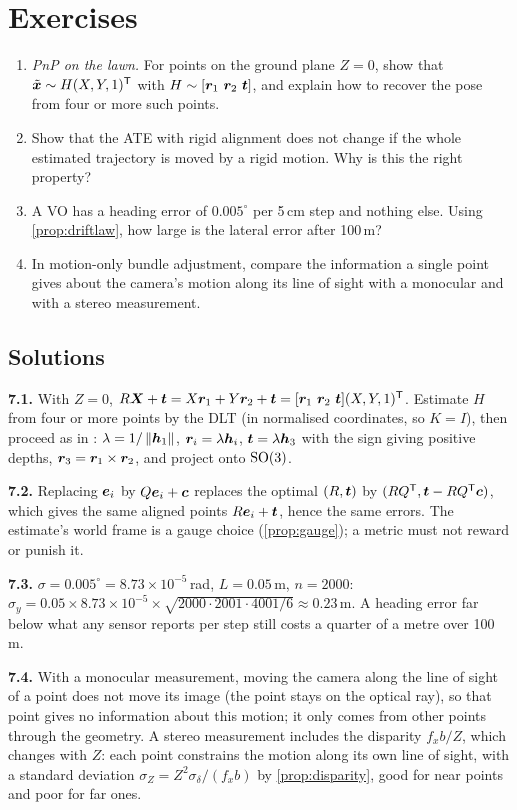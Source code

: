 \FloatBarrier
\section*{Exercises}

\begin{enumerate}[label=\textbf{7.\arabic*},ref=7.\arabic*]
\item\label{ex:7plane} \emph{PnP on the lawn.} For points on the ground
  plane $Z=0$, show that $\tilde{\bm{x}}\sim H(X,Y,1)^{\mathsf{T}}$ with
  $H\sim[\vect{r}_1\ \vect{r}_2\ \vect{t}]$, and explain how to recover
  the pose from four or more such points.
\item\label{ex:7gauge} Show that the ATE with rigid alignment does not
  change if the whole estimated trajectory is moved by a rigid motion.
  Why is this the right property?
\item\label{ex:7drift} A VO has a heading error of $0.005^\circ$ per 5\,cm
  step and nothing else. Using \cref{prop:driftlaw}, how large is the
  lateral error after 100\,m?
\item\label{ex:7stereo} In motion-only bundle adjustment, compare the
  information a single point gives about the camera's motion along its
  line of sight with a monocular and with a stereo measurement.
\end{enumerate}

\subsection*{Solutions}

\textbf{7.1.} With $Z=0$, $R\bm{X}+\bm{t}=X\bm{r}_1+Y\bm{r}_2+
\bm{t}=[\bm{r}_1\ \bm{r}_2\ \bm{t}](X,Y,1)^{\mathsf{T}}$. Estimate $H$ from
four or more points by the DLT (in normalised coordinates, so $K=I$),
then proceed as in : $\lambda=1/\left\lVert 
\bm{h}_1\right\rVert$, $\bm{r}_i=\lambda\bm{h}_i$, $\bm{t}=\lambda\bm{h}_3
$ with the sign giving positive depths, $\bm{r}_3=\bm{r}_1\times
\bm{r}_2$, and project onto $\mathrm{SO}(3)$.

\textbf{7.2.} Replacing $\bm{e}_i$ by $Q\bm{e}_i+\bm{c}$ replaces
the optimal $(R,\bm{t})$ by $(RQ^{\mathsf{T}},\bm{t}-RQ^{\mathsf{T}}\bm{c})$, which gives
the same aligned points $R\bm{e}_i+\bm{t}$, hence the same errors.
The estimate's world frame is a gauge choice (\cref{prop:gauge}); a
metric must not reward or punish it.

\textbf{7.3.} $\sigma=0.005^\circ=8.73\times10^{-5}$\,rad, $L=0.05$\,m,
$n=2000$: $\sigma_y=0.05\times8.73\times10^{-5}\times\sqrt{2000\cdot2001
\cdot4001/6}\approx0.23$\,m. A heading error far below what any sensor
reports per step still costs a quarter of a metre over 100\,m.

\textbf{7.4.} With a monocular measurement, moving the camera along the
line of sight of a point does not move its image (the point stays on
the optical ray), so that point gives no information about this motion;
it only comes from other points through the geometry. A stereo
measurement includes the disparity $f_xb/Z$, which changes with $Z$:
each point constrains the motion along its own line of sight, with a
standard deviation $\sigma_Z=Z^2\sigma_\delta/(f_xb)$ by
\cref{prop:disparity}, good for near points and poor for far ones.
